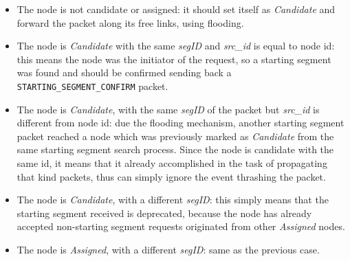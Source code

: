 \begin{itemize}
\item The node is not candidate or assigned: it should set itself as
\emph{Candidate} and forward the packet along its free links, using
flooding.  
\item The node is \emph{Candidate} with the same
\emph{segID} and \emph{src\_id} is equal to node id: this means the
node was the initiator of the request, so a starting segment was found and
should be confirmed sending back a \texttt{STARTING\_SEGMENT\_CONFIRM}
packet.  
\item The node is \emph{Candidate}, with the same \emph{segID} of the
packet but \emph{src\_id} is different from node id: due
the flooding mechanism, another starting segment packet reached a node
which was previously marked as \emph{Candidate} from the same starting segment
search process. Since the node is candidate with the same id, it means
that it already accomplished in the task of propagating that kind
packets, thus can simply ignore the event thrashing the packet.  
\item The node is \emph{Candidate}, with a different \emph{segID}: 
this simply means that the starting segment received is deprecated,
because the node has already accepted non-starting segment requests
originated from other \emph{Assigned} nodes.
\item The node is \emph{Assigned}, with a different \emph{segID}:
same as the previous case. 


\end{itemize}

